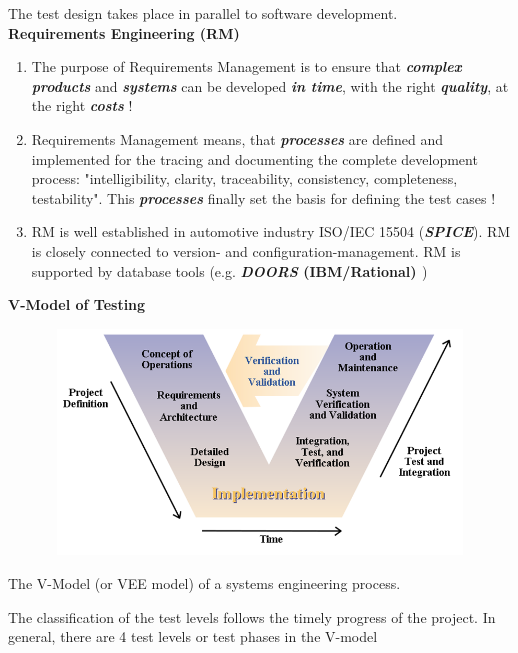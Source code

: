 The test design takes place in parallel to software development.\\

\textbf{ Requirements Engineering (RM)}

\begin{enumerate}
\item \textbf{ }The purpose of Requirements Management is to ensure that \textbf{\textit{complex products}} and \textbf{\textit{systems}} can be developed \textbf{\textit{in time}}, with the right \textbf{\textit{quality}}, at the right \textbf{\textit{costs}} !
\item  Requirements Management means, that \textbf{\textit{processes}} are defined and implemented for the tracing and documenting the complete development process: "intelligibility, clarity, traceability, consistency, completeness, testability". This \textbf{\textit{processes}} finally set the basis for defining the test cases !
\item  RM is well established in automotive industry  ISO/IEC 15504 (\textbf{\textit{SPICE}}). RM is closely connected to version- and configuration-management. RM is supported by database tools (e.g. \textbf{\textit{DOORS }(IBM/Rational)\textit{ }})
\end{enumerate}

{\rot\bf V-Model of Testing}\\

    \begin{figure}[h]
    \centering
    \includegraphics[width=12cm, height=6cm]{Images/image58.png}
    \label{fig:Fig 155}
    \end{figure}

The V-Model (or VEE model) of a systems engineering process.

The classification of the test levels follows the timely progress of the project. In general, there are 4 test levels or test phases in the V-model   

